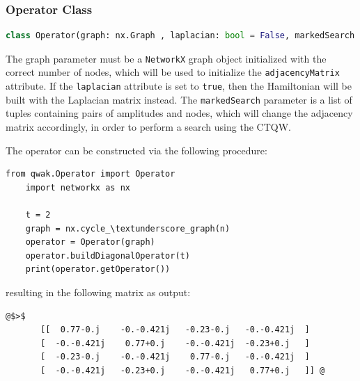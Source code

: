 \documentclass[../../dissertation.tex]{subfiles}
\begin{document}
\subsubsection{Operator Class}
\begin{lstlisting}[style=commands,mathescape,language=Python]
    class Operator(graph: nx.Graph , laplacian: bool = False, markedSearch: list = None)
\end{lstlisting}
The graph parameter must be a \texttt{NetworkX} graph object initialized with
the correct number of nodes, which will be used to initialize the
\texttt{adjacencyMatrix} attribute. If the \texttt{laplacian} attribute is set
to \texttt{true}, then the Hamiltonian will be built with the Laplacian matrix
instead. The \texttt{markedSearch} parameter is a list of tuples containing
pairs of amplitudes and nodes, which will change the adjacency matrix
accordingly, in order to perform a search using the CTQW.\par

The operator can be constructed via the following procedure:
\begin{lstlisting}[style=code,escapeinside={__}]
    from qwak.Operator import Operator 
    import networkx as nx
    
    t = 2
    graph = nx.cycle_\textunderscore_graph(n)
    operator = Operator(graph)
    operator.buildDiagonalOperator(t)
    print(operator.getOperator())
\end{lstlisting}
resulting in the following matrix as output:
\begin{lstlisting}[style=commands,mathescape]
@$>$
       [[  0.77-0.j    -0.-0.421j   -0.23-0.j   -0.-0.421j  ]
       [  -0.-0.421j    0.77+0.j    -0.-0.421j  -0.23+0.j   ]
       [  -0.23-0.j    -0.-0.421j    0.77-0.j   -0.-0.421j  ]
       [  -0.-0.421j   -0.23+0.j    -0.-0.421j   0.77+0.j   ]] @
\end{lstlisting}
\end{document}
